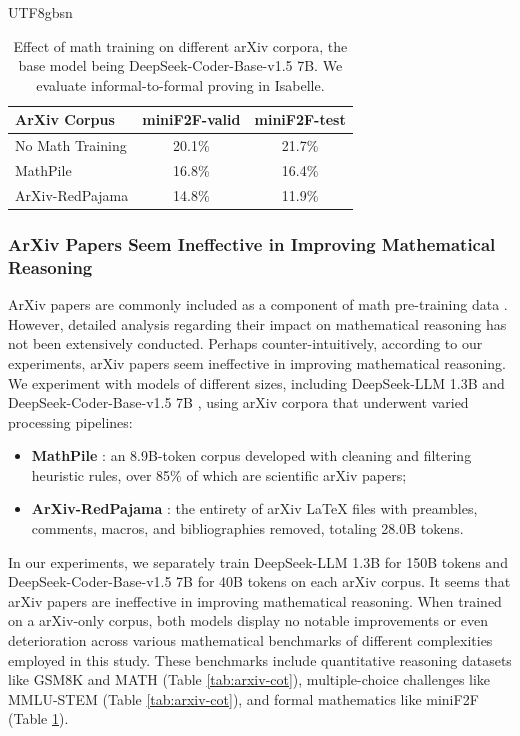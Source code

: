 \documentclass[11pt, a4paper, logo, copyright, nonumbering]{deepseek}
\begin{document}
\begin{CJK*}{UTF8}{gbsn}
\begingroup
\setlength{\tabcolsep}{3pt} 
\renewcommand{\arraystretch}{1} 

\begin{table}[t!]
    \centering
\begin{small}
\begin{tabular}{lcc} 
\toprule
ArXiv Corpus      & miniF2F-valid & miniF2F-test  \\ 
\midrule
No Math Training &   20.1\%        & 21.7\%            \\ 
\midrule
MathPile         & 16.8\%        & 16.4\%        \\
ArXiv-RedPajama  & 14.8\%        & 11.9\%        \\
\bottomrule
\end{tabular}
\end{small}
    \caption{
    Effect of math training on different arXiv corpora, the base model being DeepSeek-Coder-Base-v1.5 7B.
    We evaluate informal-to-formal proving in Isabelle.
    }
    \label{tab:arxiv_atp}
    \vspace{-0.1in}
\end{table}
\endgroup

\subsubsection{ArXiv Papers Seem Ineffective in Improving Mathematical Reasoning}

ArXiv papers are commonly included as a component of math pre-training data \citep{minerva,gpt-f,llemma,mathpile}.
However, detailed analysis regarding their impact on mathematical reasoning has not been extensively conducted.
Perhaps counter-intuitively, according to our experiments, arXiv papers seem ineffective in improving mathematical reasoning.
We experiment with models of different sizes, including DeepSeek-LLM 1.3B and DeepSeek-Coder-Base-v1.5 7B \citep{deepseek-coder}, using arXiv corpora that underwent varied processing pipelines:
\begin{itemize}[topsep=0pt]
    \item \textbf{MathPile} \citep{mathpile}:
    an 8.9B-token corpus developed with cleaning and filtering heuristic rules, over 85\% of which are scientific arXiv papers;
    \item \textbf{ArXiv-RedPajama} \citep{redpajama}:
    the entirety of arXiv LaTeX files with preambles, comments, macros, and bibliographies removed, totaling 28.0B tokens.
\end{itemize}
\noindent
In our experiments, we separately train DeepSeek-LLM 1.3B for 150B tokens and DeepSeek-Coder-Base-v1.5 7B for 40B tokens on each arXiv corpus. It seems that arXiv papers are ineffective in improving mathematical reasoning.
When trained on a arXiv-only corpus, both models display no notable improvements or even deterioration across various mathematical benchmarks of different complexities employed in this study.
These benchmarks include quantitative reasoning datasets like GSM8K and MATH (Table \ref{tab:arxiv-cot}), multiple-choice challenges like MMLU-STEM (Table \ref{tab:arxiv-cot}), and formal mathematics like miniF2F (Table \ref{tab:arxiv_atp}).


\end{CJK*}
\end{document}
